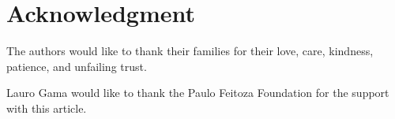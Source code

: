 \documentclass[conference]{IEEEtran}
\begin{document}
\section*{Acknowledgment}
The authors would like to thank their families for their love, care, kindness, patience, and unfailing trust.

Lauro Gama would like to thank the Paulo Feitoza Foundation for the support with this article.




%

\end{document}
